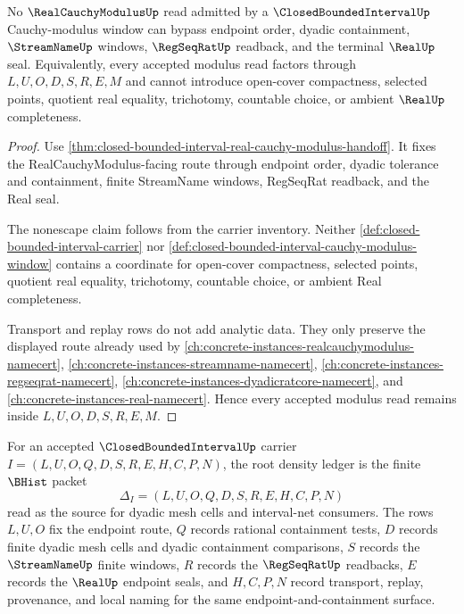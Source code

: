 \begin{theorem}
\label{thm:closed-bounded-interval-cauchy-modulus-nonescape}
No $\RealCauchyModulusUp$ read admitted by a $\ClosedBoundedIntervalUp$ Cauchy-modulus window can bypass endpoint order, dyadic containment, $\StreamNameUp$ windows, $\RegSeqRatUp$ readback, and the terminal $\RealUp$ seal. Equivalently, every accepted modulus read factors through $L,U,O,D,S,R,E,M$ and cannot introduce open-cover compactness, selected points, quotient real equality, trichotomy, countable choice, or ambient $\RealUp$ completeness.
\end{theorem}
\begin{proof}
Use \autoref{thm:closed-bounded-interval-real-cauchy-modulus-handoff}. It fixes the RealCauchyModulus-facing route through endpoint order, dyadic tolerance and containment, finite StreamName windows, RegSeqRat readback, and the Real seal.

The nonescape claim follows from the carrier inventory. Neither \autoref{def:closed-bounded-interval-carrier} nor \autoref{def:closed-bounded-interval-cauchy-modulus-window} contains a coordinate for open-cover compactness, selected points, quotient real equality, trichotomy, countable choice, or ambient Real completeness.

Transport and replay rows do not add analytic data. They only preserve the displayed route already used by \autoref{ch:concrete-instances-realcauchymodulus-namecert}, \autoref{ch:concrete-instances-streamname-namecert}, \autoref{ch:concrete-instances-regseqrat-namecert}, \autoref{ch:concrete-instances-dyadicratcore-namecert}, and \autoref{ch:concrete-instances-real-namecert}. Hence every accepted modulus read remains inside $L,U,O,D,S,R,E,M$.
\end{proof}

\begin{definition}
\label{def:closed-bounded-interval-density-ledger}
For an accepted $\ClosedBoundedIntervalUp$ carrier $I=(L,U,O,Q,D,S,R,E,H,C,P,N)$, the root density ledger is the finite $\BHist$ packet
$$
\Delta_I=(L,U,O,Q,D,S,R,E,H,C,P,N)
$$
read as the source for dyadic mesh cells and interval-net consumers. The rows $L,U,O$ fix the endpoint route, $Q$ records rational containment tests, $D$ records finite dyadic mesh cells and dyadic containment comparisons, $S$ records the $\StreamNameUp$ finite windows, $R$ records the $\RegSeqRatUp$ readbacks, $E$ records the $\RealUp$ endpoint seals, and $H,C,P,N$ record transport, replay, provenance, and local naming for the same endpoint-and-containment surface.
\end{definition}

